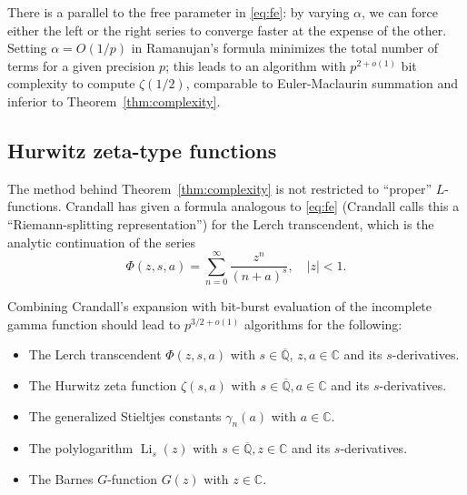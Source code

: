 \documentclass[reqno]{amsart}
\newcommand{\QQ}{\mathbb{Q}}
\newcommand{\CC}{\mathbb{C}}
\newcommand{\QQbar}{\overline{\mathbb{Q}}}
\newcommand{\be}{\begin{equation}}
\newcommand{\ee}{\end{equation}}
\theoremstyle{definition}
\begin{document}
There is a parallel to the free parameter in \eqref{eq:fe}: by varying $\alpha$, we can force
either the left or the right series to converge faster at the expense of the other.
Setting $\alpha = O(1/p)$ in Ramanujan's formula minimizes the total number of terms
for a given precision $p$;
this leads to an algorithm with $p^{2+o(1)}$ bit complexity to compute $\zeta(1/2)$,
comparable to Euler-Maclaurin summation and inferior to Theorem~\ref{thm:complexity}.

\subsection{Hurwitz zeta-type functions}



The method behind Theorem~\ref{thm:complexity} is not restricted to ``proper'' $L$-functions.
Crandall \cite{crandall2012unified,bailey2015crandall} has
given a formula analogous to \eqref{eq:fe} (Crandall calls this
a ``Riemann-splitting representation'')
for the Lerch
transcendent, which is the analytic continuation of the series
\be
\Phi(z,s,a) = \sum_{n=0}^{\infty} \frac{z^n}{(n+a)^s}, \quad |z| < 1.
\ee

Combining Crandall's expansion with bit-burst
evaluation of the incomplete gamma function should
lead to $p^{3/2+o(1)}$ algorithms for the following:
\begin{itemize}
\item The Lerch transcendent $\Phi(z,s,a)$ with $s \in \QQbar$, $z, a \in \CC$ and its $s$-derivatives.
\item The Hurwitz zeta function $\zeta(s,a)$ with $s \in \QQbar, a \in \CC$ and its $s$-derivatives.
\item The generalized Stieltjes constants $\gamma_n(a)$ with $a \in \CC$.
\item The polylogarithm $\operatorname{Li}_s(z)$ with $s \in \QQbar, z \in \CC$ and its $s$-derivatives.
\item The Barnes $G$-function $G(z)$ with $z \in \CC$.
\end{itemize}
\end{document}
